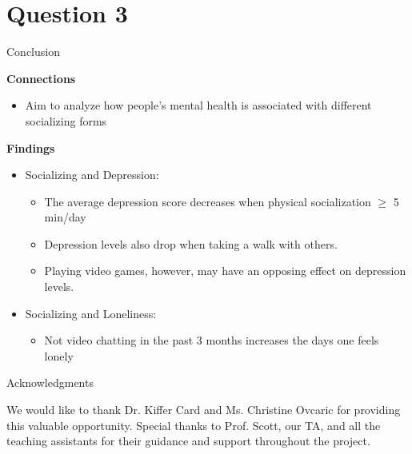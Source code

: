 \documentclass{beamer}
\begin{document}
\section{Question 3}

\begin{frame}{Conclusion}

\textbf{Connections}\\
\begin{itemize}
    \item Aim to analyze how people’s mental health is associated with different socializing forms
\end{itemize}

\textbf{Findings}\\ 
\begin{itemize}
    \item Socializing and Depression:
    \begin{itemize}
        \item The average depression score decreases when physical socialization $\geq $ 5 min/day
        \item Depression levels also drop when taking a walk with others.
        \item Playing video games, however, may have an opposing effect on depression levels.
    \end{itemize}
    \item Socializing and Loneliness:
    \begin{itemize}
        \item Not video chatting in the past 3 months increases the days one feels lonely
    \end{itemize}
\end{itemize}
    
\end{frame}

\begin{frame}{Acknowledgments}

We would like to thank Dr. Kiffer Card and Ms. Christine Ovcaric for providing this valuable opportunity. Special thanks to Prof. Scott, our TA, and all the teaching assistants for their guidance and support throughout the project.
\end{frame}
\end{document}
